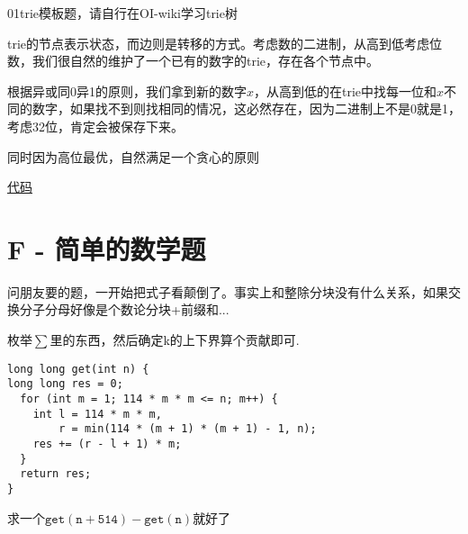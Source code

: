 \documentclass{beamer}
\begin{document}
  \begin{frame}
    01trie模板题，请自行在OI-wiki学习trie树

    \vspace*{1\baselineskip}

    trie的节点表示状态，而边则是转移的方式。考虑数的二进制，从高到低考虑位数，我们很自然的维护了一个已有的数字的trie，存在各个节点中。

    \vspace*{1\baselineskip}
    
    根据异或同0异1的原则，我们拿到新的数字$x$，从高到低的在trie中找每一位和$x$不同的数字，如果找不到则找相同的情况，这必然存在，因为二进制上不是0就是1，考虑32位，肯定会被保存下来。

    \vspace*{1\baselineskip}

    同时因为高位最优，自然满足一个贪心的原则

    \vspace*{1\baselineskip}

    \href{https://syh521.cn/file/e.cpp}{代码}
  \end{frame}

  \section{F - 简单的数学题}

  \begin{frame}
    问朋友要的题，一开始把式子看颠倒了。事实上和整除分块没有什么关系，如果交换分子分母好像是个数论分块+前缀和...

    \vspace*{1\baselineskip}

    枚举$\sum$里的东西，然后确定k的上下界算个贡献即可.
  \end{frame}

  \begin{frame}[fragile]
\begin{lstlisting}
long long get(int n) {
long long res = 0;
  for (int m = 1; 114 * m * m <= n; m++) {
    int l = 114 * m * m,
        r = min(114 * (m + 1) * (m + 1) - 1, n);
    res += (r - l + 1) * m;
  }
  return res;
}
\end{lstlisting}

  \pause

  \vspace*{1\baselineskip}

  求一个$\mathtt{get(n+514)-get(n)}$就好了
  \end{frame}
\end{document}

